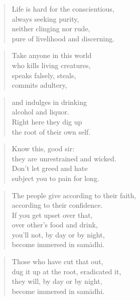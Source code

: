 \documentclass[12pt,openany]{book}%
\begin{document}
\begin{verse}%
Life is hard for the conscientious, \\
always seeking purity, \\
neither clinging nor rude, \\
pure of livelihood and discerning. 

%
\end{verse}

\begin{verse}%
Take anyone in this world \\
who kills living creatures, \\
speaks falsely, steals, \\
commits adultery, 

%
\end{verse}

\begin{verse}%
and indulges in drinking \\
alcohol and liquor. \\
Right here they dig up \\
the root of their own self. 

%
\end{verse}

\begin{verse}%
Know this, good sir: \\
they are unrestrained and wicked. \\
Don’t let greed and hate \\
subject you to pain for long. 

%
\end{verse}

\begin{verse}%
The people give according to their faith, \\
according to their confidence. \\
If you get upset over that, \\
over other’s food and drink, \\
you’ll not, by day or by night, \\
become immersed in \textsanskrit{samādhi}. 

%
\end{verse}

\begin{verse}%
Those who have cut that out, \\
dug it up at the root, eradicated it, \\
they will, by day or by night, \\
become immersed in \textsanskrit{samādhi}. 

%
\end{verse}
\end{document}
